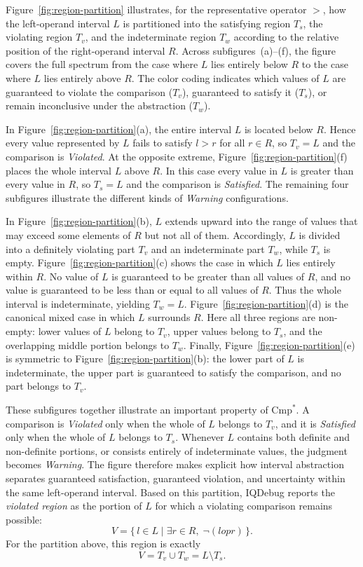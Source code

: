 \documentclass[11pt,oneside]{report}
\theoremstyle{plain}
\theoremstyle{definition}
\theoremstyle{remark}
\begin{document}
Figure~\ref{fig:region-partition} illustrates, for the representative operator
$>$, how the left-operand interval $L$ is partitioned into the satisfying
region $T_s$, the violating region $T_v$, and the indeterminate region $T_w$
according to the relative position of the right-operand interval $R$.
Across subfigures~(a)--(f), the figure covers the full spectrum from the case
where $L$ lies entirely below $R$ to the case where $L$ lies entirely above
$R$.
The color coding indicates which values of $L$ are guaranteed to violate the
comparison (\(T_v\)), guaranteed to satisfy it (\(T_s\)), or remain
inconclusive under the abstraction (\(T_w\)).

In Figure~\ref{fig:region-partition}(a), the entire interval $L$ is located
below $R$.
Hence every value represented by $L$ fails to satisfy $l > r$ for all
$r \in R$, so $T_v = L$ and the comparison is \textit{Violated}.
At the opposite extreme, Figure~\ref{fig:region-partition}(f) places the whole
interval $L$ above $R$.
In this case every value in $L$ is greater than every value in $R$, so
$T_s = L$ and the comparison is \textit{Satisfied}.
The remaining four subfigures illustrate the different kinds of
\textit{Warning} configurations.

In Figure~\ref{fig:region-partition}(b), $L$ extends upward into the range of
values that may exceed some elements of $R$ but not all of them.
Accordingly, $L$ is divided into a definitely violating part $T_v$ and an
indeterminate part $T_w$, while $T_s$ is empty.
Figure~\ref{fig:region-partition}(c) shows the case in which $L$ lies entirely
within $R$.
No value of $L$ is guaranteed to be greater than all values of $R$, and no
value is guaranteed to be less than or equal to all values of $R$.
Thus the whole interval is indeterminate, yielding $T_w = L$.
Figure~\ref{fig:region-partition}(d) is the canonical mixed case in which $L$
surrounds $R$.
Here all three regions are non-empty: lower values of $L$ belong to $T_v$,
upper values belong to $T_s$, and the overlapping middle portion belongs to
$T_w$.
Finally, Figure~\ref{fig:region-partition}(e) is symmetric to
Figure~\ref{fig:region-partition}(b): the lower part of $L$ is indeterminate,
the upper part is guaranteed to satisfy the comparison, and no part belongs to
$T_v$.

These subfigures together illustrate an important property of
$\mathrm{Cmp}^{*}$.
A comparison is \textit{Violated} only when the whole of $L$ belongs to
$T_v$, and it is \textit{Satisfied} only when the whole of $L$ belongs to
$T_s$.
Whenever $L$ contains both definite and non-definite portions, or consists
entirely of indeterminate values, the judgment becomes \textit{Warning}.
The figure therefore makes explicit how interval abstraction separates
guaranteed satisfaction, guaranteed violation, and uncertainty within the same
left-operand interval.
Based on this partition, IQDebug reports the \textit{violated region} as the
portion of $L$ for which a violating comparison remains possible:
\[
V
=
\{\,l\in L
\mid
\exists r\in R,\;
\neg(l\mathrel{op}r)
\,\}.
\]
For the partition above, this region is exactly
\[
V = T_v \cup T_w = L \setminus T_s.
\]
\end{document}
